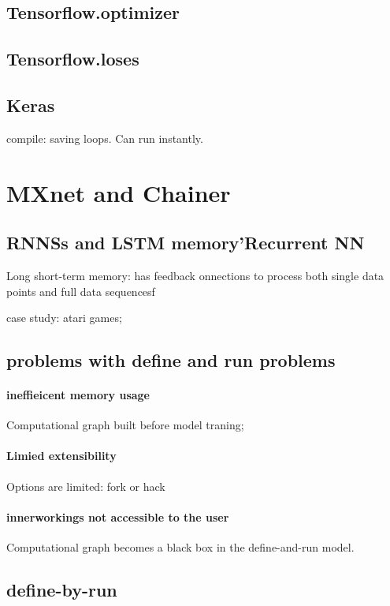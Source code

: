 \documentclass[12pt]{article}
\begin{document}
\subsection{Tensorflow.optimizer}

\subsection{Tensorflow.loses}

\subsection{Keras}
compile: saving loops. Can run instantly.



\section{MXnet and Chainer}
\subsection{RNNSs and LSTM memory'Recurrent NN}
Long short-term memory: has feedback onnections to process both single data points and full data sequencesf

case study: atari games;

\subsection{problems with define and run problems} 
\paragraph{ineffieicent memory usage} Computational graph built before model traning;

\paragraph{Limied extensibility} Options are limited: fork or hack

\paragraph{innerworkings not accessible to the user} Computational graph becomes a black box in the define-and-run model.

\subsection{define-by-run}
\end{document}
